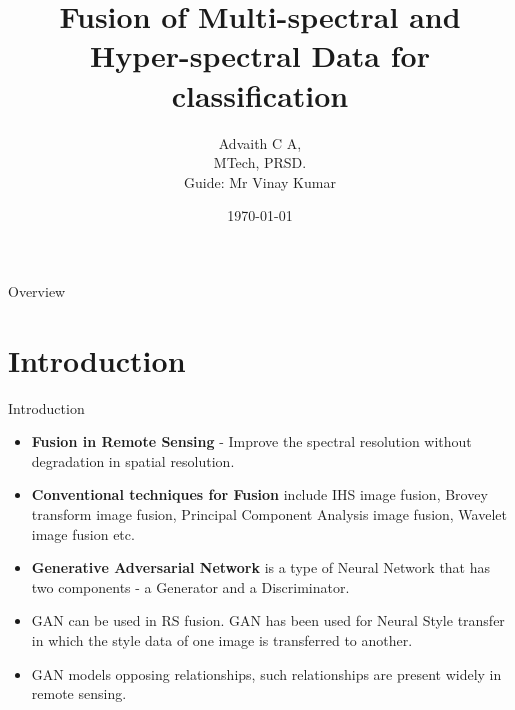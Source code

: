 \documentclass{beamer}
\title[Image Fusion using GAN]{Fusion of Multi-spectral and Hyper-spectral Data for classification}
\author[Advaith C A]{Advaith C A,\\MTech, PRSD.\\Guide: Mr Vinay Kumar}
\date{\today}
\begin{document}
\begin{frame}
    \maketitle
\end{frame}
\begin{frame}{Overview}
    \hfill
    \parbox[t]{.89\textwidth}{
      \begin{minipage}[c][0.6\textheight]{\textwidth}
      \tableofcontents
      \end{minipage}
    }
\end{frame}
\section{Introduction}
\begin{frame}{Introduction}
    \begin{itemize}
        \item \textbf{Fusion in Remote Sensing} - Improve the spectral resolution without degradation in spatial resolution.
        \item \textbf{Conventional techniques for Fusion} include IHS image fusion, Brovey transform image fusion, Principal Component Analysis image fusion, Wavelet image fusion etc.
        \item \textbf{Generative Adversarial Network} is a type of Neural Network that has two components - a Generator and a Discriminator.
        \item GAN can be used in RS fusion. GAN has been used for Neural Style transfer in which the style data of one image is transferred to another.
        \item GAN models opposing relationships, such relationships are present widely in remote sensing.
    \end{itemize}
\end{frame}
\end{document}

